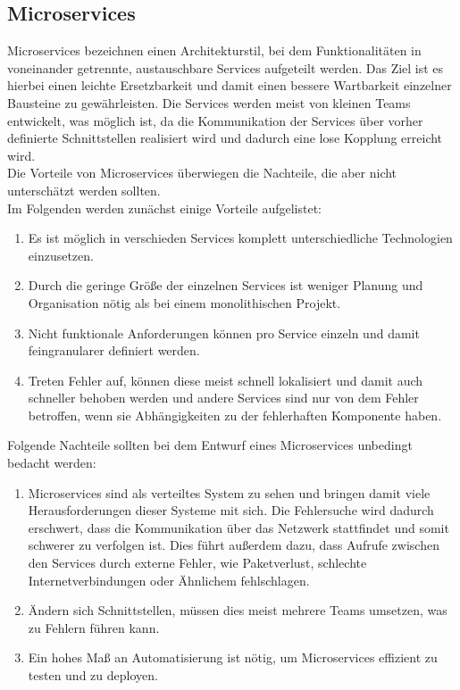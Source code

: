 \subsection{Microservices} %
\label{sub:Microservices}
Microservices bezeichnen einen Architekturstil, bei dem Funktionalitäten in voneinander getrennte, austauschbare Services aufgeteilt werden.
Das Ziel ist es hierbei einen leichte Ersetzbarkeit und damit einen bessere Wartbarkeit einzelner Bausteine zu gewährleisten.
Die Services werden meist von kleinen Teams entwickelt, was möglich ist, da die Kommunikation der Services über vorher definierte Schnittstellen realisiert wird und dadurch eine lose Kopplung erreicht wird.\\
Die Vorteile von Microservices überwiegen die Nachteile, die aber nicht unterschätzt werden sollten.~\cite{GrundlagenModular}\\

Im Folgenden werden zunächst einige Vorteile aufgelistet:
\begin{enumerate}
    \item Es ist möglich in verschieden Services komplett unterschiedliche Technologien einzusetzen.
    \item Durch die geringe Größe der einzelnen Services ist weniger Planung und Organisation nötig als bei einem monolithischen Projekt.
    \item Nicht funktionale Anforderungen können pro Service einzeln und damit feingranularer definiert werden.
    \item Treten Fehler auf, können diese meist schnell lokalisiert und damit auch schneller behoben werden und andere Services sind nur von dem Fehler betroffen, wenn sie Abhängigkeiten zu der fehlerhaften Komponente haben.
\end{enumerate}

Folgende Nachteile sollten bei dem Entwurf eines Microservices unbedingt bedacht werden:
\begin{enumerate}
    \item Microservices sind als verteiltes System zu sehen und bringen damit viele Herausforderungen dieser Systeme mit sich. Die Fehlersuche wird dadurch erschwert, dass die Kommunikation über das Netzwerk stattfindet und somit schwerer zu verfolgen ist. Dies führt außerdem dazu, dass Aufrufe zwischen den Services durch externe Fehler, wie Paketverlust, schlechte Internetverbindungen oder Ähnlichem fehlschlagen.
    \item Ändern sich Schnittstellen, müssen dies meist mehrere Teams umsetzen, was zu Fehlern führen kann.
    \item Ein hohes Maß an Automatisierung ist nötig, um Microservices effizient zu testen und zu deployen.
\end{enumerate}

